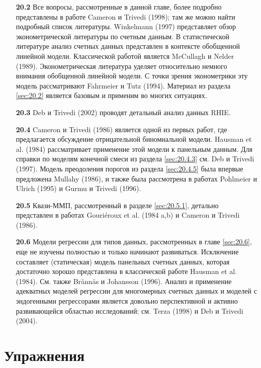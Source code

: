 \noindent
\begin{itemize}
    \item[\textbf{20.2}]
Все вопросы, рассмотренные в данной главе, более подробно представлены в работе Cameron и Trivedi (1998); там же можно найти подробный список литературы. Winkelmann (1997) представляет обзор эконометрической литературы по счетным данным. В статистической литературе анализ счетных данных представлен в контексте обобщенной линейной модели. Классической работой является McCullagh и Nelder (1989). Эконометрическая литература уделяет относительно немного внимания обобщенной линейной модели. С точки зрения эконометрики эту модель рассматривают Fahrmeier и Tutz (1994). Материал из раздела \ref{sec:20.2} является базовым и применим во многих ситуациях.

    \item[\textbf{20.3}]
Deb и Trivedi (2002) проводят детальный анализ данных RHIE.

    \item[\textbf{20.4}]
Cameron и Trivedi (1986) является одной из первых работ, где предлагается обсуждение отрицательной биномиальной модели. Hausman et al. (1984) рассматривает применение этой модели к панельным данным. Для справки по моделям конечной смеси из раздела \ref{sec:20.4.3} см. Deb и Trivedi (1997). Модель преодоления порогов из раздела \ref{sec:20.4.5} была впервые предложена Mullahy (1986), и также была рассмотрена в работах Pohlmeier и Ulrich (1995) и Gurmu и Trivedi (1996).

    \item[\textbf{20.5}]
Квази-ММП, рассмотренный в разделе \ref{sec:20.5.1}, детально представлен в работах Gouri\'eroux et al. (1984 a,b) и Cameron и Trivedi (1986).

    \item[\textbf{20.6}]
Модели регрессии для типов данных, рассмотренных в главе \ref{sec:20.6}, еще не изучены полностью и только начинают развиваться. Исключение составляет (статическая) модель панельных счетных данных, которая достаточно хорошо представлена в классической работе Hausman et al. (1984). См. также Br\"ann\"as и Johansson (1996). Анализ и применение адекватных моделей регрессии для многомерных счетных данных и моделей с эндогенными регрессорами является довольно перспективной и активно развивающейся областью исследований; см. Terza (1998) и Deb и Trivedi (2004).
\end{itemize}




\section{Упражнения}\label{sec:20.ex}

